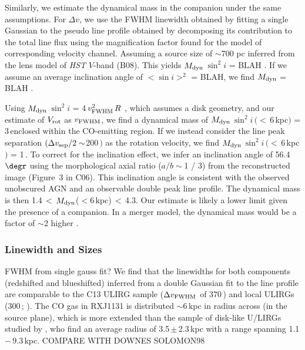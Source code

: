 \documentclass[]{emulateapj}
\begin{document}
Similarly, we estimate the dynamical mass in the companion under the same assumptions. 
For $\Delta v$, we use the FWHM linewidth obtained by fitting a single Gaussian to the pseudo 
\bco line profile obtained by decomposing its contribution to the total line flux using the magnification factor
found for the model of corresponding velocity channel.
Assuming a source size of $\sim$700 pc inferred from the lens model of {\it HST} $V$-band (B08).
This yields $M_{\rm dyn}$\,$\sin^2 i$ = BLAH \Msun.
If we assume an average inclination angle of $<\sin i>^2$ = BLAH, we find $M_{\rm dyn}$ = BLAH \Msun.

Using $M_{\rm dyn}$\,$\sin^2 i$ = 4\,$v_{\rm FWHM}^2\,R$
 \citep{Neri03a}, which assumes a disk geometry,  and our estimate of $V_{\rm rot}$ as 
$v_{\rm FWHM}$, we find a dynamical mass of
$M_{\rm dyn}$\,$\sin^2 i$\,$(<$\,6\,kpc$)$ = 3\,\Msun enclosed
within the CO-emitting region. 
If we instead consider the
\bco line peak separation $(\Delta v_{\rm sep}/2 \sim$200\,\kms$)$ as the rotation velocity, we find
$M_{\rm dyn}$\,$\sin^2 i$\,$(<$\,6\,kpc$)$ = 1\,\Msun.
To correct for the inclination effect, we
infer an inclination angle of 56.4$\degr$ using
the morphological axial ratio ($a/b\sim$1 / 3) 
from the reconstructed image (Figure~3 in C06). This inclination angle 
is consistent with the
observed unobscured AGN and an observable double peak line profile.
The dynamical mass is then
1.4\Msun\,$<$\,$M_{\rm dyn}$($<$6\,kpc)\,$<$\,4.3\Msun.
Our estimate is likely a lower limit given the presence of a companion. In a merger model, 
the dynamical mass would be a factor of $\sim$2 higher \citep[and references therein]{Neri03a}.

 
\subsubsection{Linewidth and Sizes} 
FWHM from single gauss fit?
We find that the linewidths for both components (redshifted and blueshifted)
inferred from a double Gaussian fit to the line profile are
comparable to the C13 ULIRG sample
($\Delta v_{\rm FWHM}$ of 370\,\kms) and local ULIRGs
(300\,\kms; \citealt[][]{Solomon97a}).
The CO gas in RXJ1131 is
distributed $\sim$6\,kpc in radius across (in
the source plane), which is more extended than the
sample of disk-like U/LIRGs studied by
\citet[hereafter U14]{Ueda14a}, %
who find an average radius of 3.5\,$\pm$\,2.3\,kpc
with a range spanning 1.1\,$-$\,9.3\,kpc.
COMPARE WITH DOWNES SOLOMON98
\end{document}
